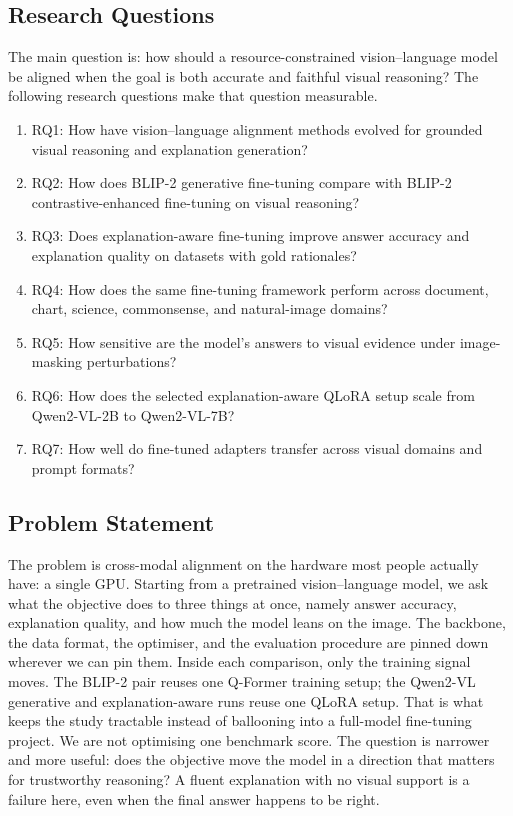 \documentclass[preprint,12pt]{elsarticle}
\begin{document}
\subsection{Research Questions}
The main question is: how should a resource-constrained vision--language model be aligned when the goal is both accurate and faithful visual reasoning?
The following research questions make that question measurable.

\begin{enumerate}
    \item RQ1: How have vision--language alignment methods evolved for grounded visual reasoning and explanation generation?
    \item RQ2: How does BLIP-2 generative fine-tuning compare with BLIP-2 contrastive-enhanced fine-tuning on visual reasoning?
    \item RQ3: Does explanation-aware fine-tuning improve answer accuracy and explanation quality on datasets with gold rationales?
    \item RQ4: How does the same fine-tuning framework perform across document, chart, science, commonsense, and natural-image domains?
    \item RQ5: How sensitive are the model's answers to visual evidence under image-masking perturbations?
    \item RQ6: How does the selected explanation-aware QLoRA setup scale from Qwen2-VL-2B to Qwen2-VL-7B?
    \item RQ7: How well do fine-tuned adapters transfer across visual domains and prompt formats?
\end{enumerate}

\subsection{Problem Statement}
The problem is cross-modal alignment on the hardware most people actually have: a single GPU.
Starting from a pretrained vision--language model, we ask what the objective does to three things at once, namely answer accuracy, explanation quality, and how much the model leans on the image.
The backbone, the data format, the optimiser, and the evaluation procedure are pinned down wherever we can pin them.
Inside each comparison, only the training signal moves.
The BLIP-2 pair reuses one Q-Former training setup; the Qwen2-VL generative and explanation-aware runs reuse one QLoRA setup.
That is what keeps the study tractable instead of ballooning into a full-model fine-tuning project.
We are not optimising one benchmark score.
The question is narrower and more useful: does the objective move the model in a direction that matters for trustworthy reasoning?
A fluent explanation with no visual support is a failure here, even when the final answer happens to be right.
\end{document}
